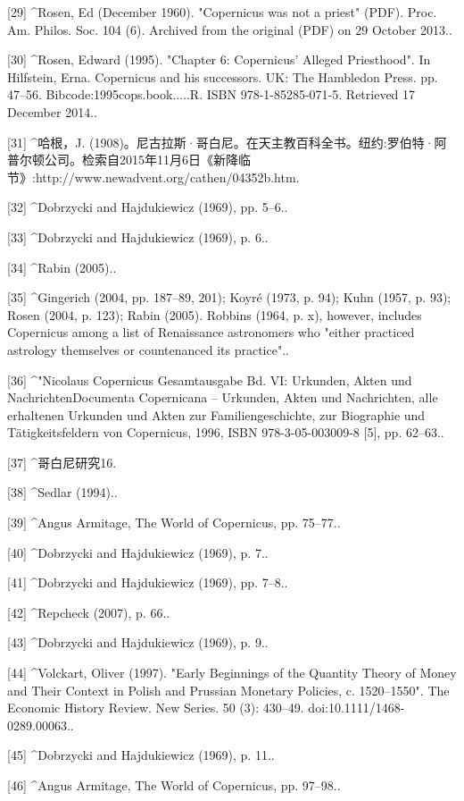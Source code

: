 [29]
^Rosen, Ed (December 1960). "Copernicus was not a priest" (PDF). Proc. Am. Philos. Soc. 104 (6). Archived from the original (PDF) on 29 October 2013..

[30]
^Rosen, Edward (1995). "Chapter 6: Copernicus' Alleged Priesthood". In Hilfstein, Erna. Copernicus and his successors. UK: The Hambledon Press. pp. 47–56. Bibcode:1995cops.book.....R. ISBN 978-1-85285-071-5. Retrieved 17 December 2014..

[31]
^哈根，J. (1908)。尼古拉斯·哥白尼。在天主教百科全书。纽约:罗伯特·阿普尔顿公司。检索自2015年11月6日《新降临节》:http://www.newadvent.org/cathen/04352b.htm.

[32]
^Dobrzycki and Hajdukiewicz (1969), pp. 5–6..

[33]
^Dobrzycki and Hajdukiewicz (1969), p. 6..

[34]
^Rabin (2005)..

[35]
^Gingerich (2004, pp. 187–89, 201); Koyré (1973, p. 94); Kuhn (1957, p. 93); Rosen (2004, p. 123); Rabin (2005). Robbins (1964, p. x), however, includes Copernicus among a list of Renaissance astronomers who "either practiced astrology themselves or countenanced its practice"..

[36]
^"Nicolaus Copernicus Gesamtausgabe Bd. VI: Urkunden, Akten und NachrichtenDocumenta Copernicana – Urkunden, Akten und Nachrichten, alle erhaltenen Urkunden und Akten zur Familiengeschichte, zur Biographie und Tätigkeitsfeldern von Copernicus, 1996, ISBN 978-3-05-003009-8 [5], pp. 62–63..

[37]
^哥白尼研究16.

[38]
^Sedlar (1994)..

[39]
^Angus Armitage, The World of Copernicus, pp. 75–77..

[40]
^Dobrzycki and Hajdukiewicz (1969), p. 7..

[41]
^Dobrzycki and Hajdukiewicz (1969), pp. 7–8..

[42]
^Repcheck (2007), p. 66..

[43]
^Dobrzycki and Hajdukiewicz (1969), p. 9..

[44]
^Volckart, Oliver (1997). "Early Beginnings of the Quantity Theory of Money and Their Context in Polish and Prussian Monetary Policies, c. 1520–1550". The Economic History Review. New Series. 50 (3): 430–49. doi:10.1111/1468-0289.00063..

[45]
^Dobrzycki and Hajdukiewicz (1969), p. 11..

[46]
^Angus Armitage, The World of Copernicus, pp. 97–98..

